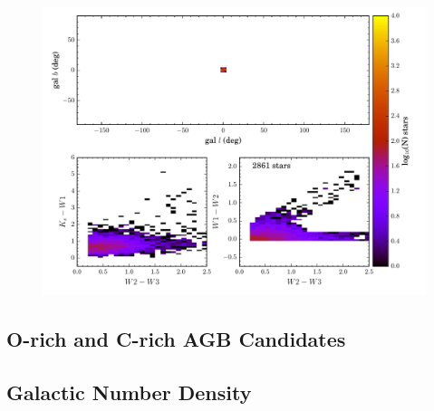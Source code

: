 \begin{figure}[h]
\includegraphics[width=6.5in]{figs/color_and_map_candidates_region5.pdf}
\caption{\label{fig:color_map_candidates5}}
\end{figure}


\subsection{O-rich and C-rich AGB Candidates}

\subsection{Galactic Number Density}
